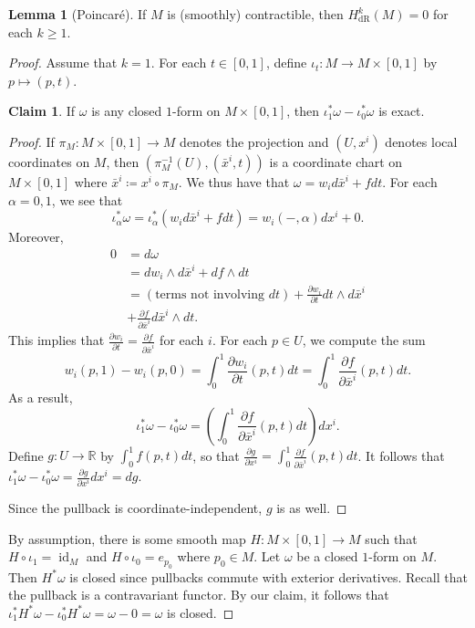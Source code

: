 \documentclass[10pt,letterpaper,cm]{nupset}
\theoremstyle{definition}
\theoremstyle{theorem}
\newtheorem{lemma}[definition]{Lemma}
\newtheorem*{claim}{Claim}
\theoremstyle{remark}
\newcommand{\R}{\mathbb R}
\newcommand{\1}{\mathbf{1}}
\newcommand{\0}{\vec 0}
\DeclareMathOperator{\id}{id}
\DeclareMathOperator{\dr}{dR}
\begin{document}
\begin{lemma}[Poincar\'e]
If $M$ is (smoothly) contractible, then $H_{\dr}^k(M) = 0$ for each $k\geq 1$.
\end{lemma}
\begin{proof}
Assume that $k=1$. For each $t\in [0,1]$, define $\iota_t : M \to M \times [0,1]$ by $p\mapsto (p, t)$.
\begin{claim} If $\omega$ is any closed $1$-form  on $M\times [0,1]$, then $\iota^{\ast}_1\omega -\iota^{\ast}_0\omega$ is exact. \end{claim}
\begin{proof} If $\pi_M : M \times [0,1] \to M$ denotes the projection and $(U, x^i)$ denotes local coordinates on $M$, then $(\pi_M^{-1}(U), (\bar{x}^i, t))$ is a coordinate chart on $M \times [0,1]$ where $\bar{x}^i \coloneqq  x^i \circ \pi_M$. We thus have that $\omega = w_id\bar{x}^i+ f dt$. For each $\alpha =0,1$, we see that $$ \iota^{\ast}_{\alpha}\omega = \iota^{\ast}_{\alpha}(w_id\bar{x}^i +fdt)=w_i(-, \alpha)dx^i +0  .$$ Moreover, 
\begin{align*}  0 & =d\omega
\\ &  =dw_i \wedge d\bar{x}^i +df \wedge dt \\ & = (\text{terms not involving }dt) +\frac{\partial{w_i}}{\partial{t}}dt \wedge d\bar{x}^i 
\\ & +\frac{\partial{f}}{\partial{\bar{x}^i}}d\bar{x}^i\wedge dt  . \end{align*}
This implies that $\frac{\partial{w_i}}{\partial{t}} = \frac{\partial{f}}{\partial{\bar{x}^i}}$ for each $i$. For each $p\in U$, we compute the sum 
$$ w_i(p, 1) -w_i(p,0) = \int_0^1  \frac{\partial{w_i}}{\partial{t}}(p, t)dt =  \int_0^1 \frac{\partial{f}}{\partial{\bar{x}^i}}(p,t)dt .$$ As a result, $$\iota^{\ast}_1 \omega -\iota^{\ast}_0 \omega =  \left( \int_0^1 \frac{\partial{f}}{\partial{\bar{x}^i}}(p,t)dt \right)dx^i .$$ Define $g: U \to \R$ by $\int_0^1f(p,t)dt$, so that $\frac{\partial{g}}{\partial{x^i}} = \int_0^1\frac{\partial{f}}{\partial{\bar{x}^i}}(p,t)dt$. It follows that $\iota^{\ast}_1 \omega -\iota^{\ast}_0 \omega  = \frac{\partial{g}}{\partial{x^i}}dx^i = dg.$

\medskip

 Since the pullback is coordinate-independent, $g$ is as well.
\end{proof}
By assumption, there is some smooth map $H: M \times [0,1] \to M$ such that $H \circ \iota_1 =\id_M$ and $H \circ \iota_0 = e_{p_0}$ where $p_0 \in M$. Let $\omega$ be a closed $1$-form  on $M$. Then $H^{\ast} \omega$ is closed since pullbacks commute with exterior derivatives. Recall that the pullback is a contravariant functor. By our claim, it follows that $\iota^{\ast}_1H^{\ast}\omega - \iota^{\ast}_0 H^{\ast}\omega = \omega -0 = \omega$ is closed.


\end{proof}
\end{document}
